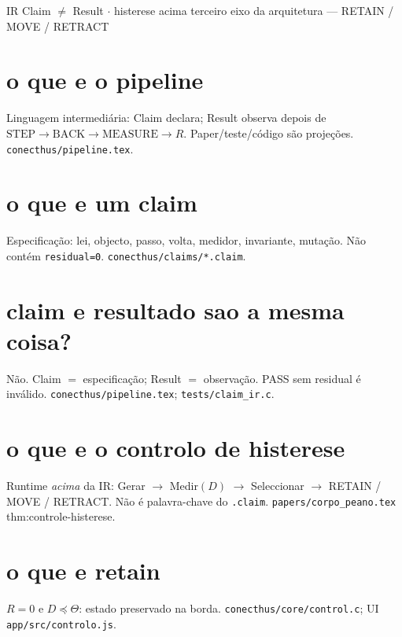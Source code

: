 \documentclass[11pt,a4paper]{article}
\newcommand{\code}[1]{\texttt{\small #1}}
\begin{document}
       {IR Claim $\neq$ Result $\cdot$ histerese acima}
       {terceiro eixo da arquitetura --- RETAIN / MOVE / RETRACT}
\maketitle
\begin{abstract}
Pares curtos da IR do pipeline e do Controlo de Histerese.
Especificação: \code{conecthus/pipeline.tex}; arquitetura
\code{papers/arquitetura.tex} \S pipeline; Peano
\code{thm:controle-histerese}. UI: \code{app/src/controlo.js}.
\end{abstract}

\section{o que e o pipeline}
Linguagem intermediária: \textsf{Claim} declara; \textsf{Result} observa
depois de $\mathrm{STEP}\to\mathrm{BACK}\to\mathrm{MEASURE}\to R$.
Paper/teste/código são projeções. \code{conecthus/pipeline.tex}.

\section{o que e um claim}
Especificação: lei, objecto, passo, volta, medidor, invariante, mutação.
Não contém \code{residual=0}. \code{conecthus/claims/*.claim}.

\section{claim e resultado sao a mesma coisa?}
Não. Claim $=$ especificação; Result $=$ observação. PASS sem residual é
inválido. \code{conecthus/pipeline.tex}; \code{tests/claim\_ir.c}.

\section{o que e o controlo de histerese}
Runtime \emph{acima} da IR: Gerar $\to$ Medir$(D)$ $\to$ Seleccionar $\to$
RETAIN / MOVE / RETRACT. Não é palavra-chave do \code{.claim}.
\code{papers/corpo\_peano.tex} thm:controle-histerese.

\section{o que e retain}
$R=0$ e $D\preceq\Theta$: estado preservado na borda.
\code{conecthus/core/control.c}; UI \code{app/src/controlo.js}.
\end{document}
